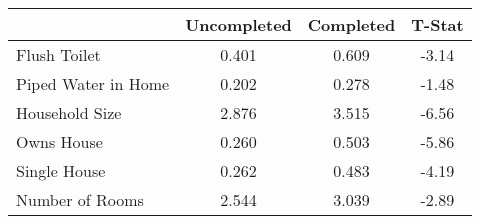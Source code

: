 \begin{tabular}{l*{1}{ccc}}
 &Uncompleted &Completed &T-Stat  \\
\hline 
Flush Toilet &      0.401 &      0.609 &      -3.14  \\
Piped Water in Home &      0.202 &      0.278 &      -1.48  \\
Household Size &      2.876 &      3.515 &      -6.56  \\
Owns House &      0.260 &      0.503 &      -5.86  \\
Single House &      0.262 &      0.483 &      -4.19  \\
Number of Rooms &      2.544 &      3.039 &      -2.89  \\
\hline
\end{tabular}